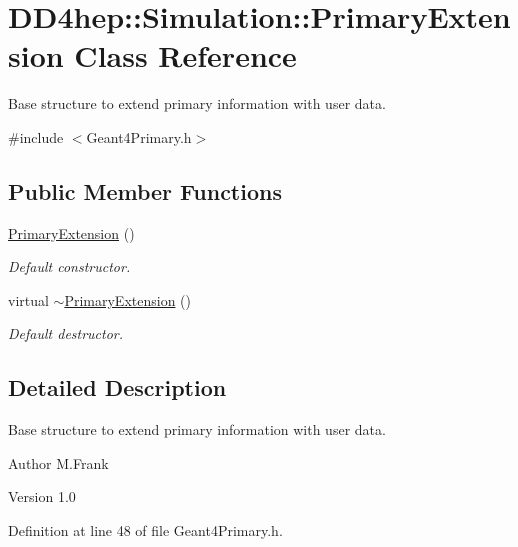 \hypertarget{class_d_d4hep_1_1_simulation_1_1_primary_extension}{
\section{DD4hep::Simulation::PrimaryExtension Class Reference}
\label{class_d_d4hep_1_1_simulation_1_1_primary_extension}
}


Base structure to extend primary information with user data.  


{\ttfamily \#include $<$Geant4Primary.h$>$}\subsection*{Public Member Functions}
\begin{DoxyCompactItemize}
\item 
\hyperlink{class_d_d4hep_1_1_simulation_1_1_primary_extension_af38d37160f1a2bcc08ac36aa866be163}{PrimaryExtension} ()
\begin{DoxyCompactList}\small\item\em Default constructor. \item\end{DoxyCompactList}\item 
virtual \hyperlink{class_d_d4hep_1_1_simulation_1_1_primary_extension_a5fb5927720e46d98279b72bfe42c061f}{$\sim$PrimaryExtension} ()
\begin{DoxyCompactList}\small\item\em Default destructor. \item\end{DoxyCompactList}\end{DoxyCompactItemize}


\subsection{Detailed Description}
Base structure to extend primary information with user data. \begin{DoxyAuthor}{Author}
M.Frank 
\end{DoxyAuthor}
\begin{DoxyVersion}{Version}
1.0 
\end{DoxyVersion}


Definition at line 48 of file Geant4Primary.h.

